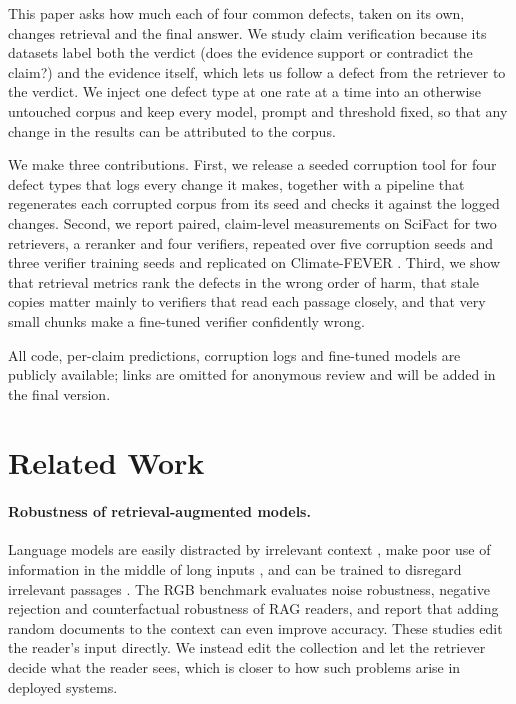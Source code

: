 \documentclass[11pt]{article}
\begin{document}
This paper asks how much each of four common defects, taken on its own, changes retrieval and the final
answer. We study claim verification because its datasets label both the verdict (does the evidence
support or contradict the claim?) and the evidence itself, which lets us follow a defect from the
retriever to the verdict. We inject one defect type at one rate at a time into an otherwise untouched
corpus and keep every model, prompt and threshold fixed, so that any change in the results can be
attributed to the corpus.

We make three contributions. First, we release a seeded corruption tool for four defect types that logs
every change it makes, together with a pipeline that regenerates each corrupted corpus from its seed and
checks it against the logged changes. Second, we report paired, claim-level measurements on SciFact
\citep{wadden2020scifact} for two retrievers, a reranker and four verifiers, repeated over five corruption
seeds and three verifier training seeds and replicated on Climate-FEVER \citep{diggelmann2020climatefever}.
Third, we show that retrieval metrics rank the defects in the wrong order of harm, that stale copies matter
mainly to verifiers that read each passage closely, and that very small chunks make a fine-tuned verifier
confidently wrong.

All code, per-claim predictions, corruption logs and fine-tuned models are publicly
available; links are omitted for anonymous review and will be added in the final version.

\section{Related Work}

\paragraph{Robustness of retrieval-augmented models.}
Language models are easily distracted by irrelevant context \citep{shi2023distracted}, make poor use of
information in the middle of long inputs \citep{liu2024lost}, and can be trained to disregard irrelevant
passages \citep{yoran2024robust}. The RGB benchmark \citep{chen2024rgb} evaluates noise robustness,
negative rejection and counterfactual robustness of RAG readers, and \citet{cuconasu2024noise} report that
adding random documents to the context can even improve accuracy. These studies edit the reader's input
directly. We instead edit the collection and let the retriever decide what the reader sees, which is closer
to how such problems arise in deployed systems.
\end{document}
